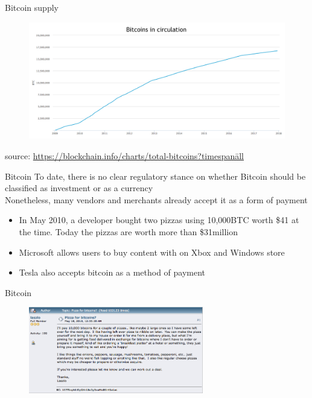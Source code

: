 \documentclass[10pt]{beamer}
\begin{document}

\begin{frame}{Bitcoin supply}
	\begin{figure}[]
		\centering
		\includegraphics  [scale=0.2]{Images/btc-circulation}
	\end{figure}
		\begin{scriptsize}
		source: \href{https://blockchain.info/charts/total-bitcoins?timespan=all}{https://blockchain.info/charts/total-bitcoins?timespan\=all}
	\end{scriptsize}
\end{frame}


\begin{frame}{Bitcoin}
	To date, there is no clear regulatory stance on whether Bitcoin should be classified as investment or as a currency \\ \vspace{3mm}
	Nonetheless, many vendors and merchants already accept it as a form of payment
	\begin{itemize}
		\item In May 2010, a developer bought two pizzas using 10,000BTC worth \$41 at the time. Today the pizzas are worth more than \$31million
		\item Microsoft allows users to buy content with on Xbox and Windows store
		\item Tesla also accepts bitcoin as a method of payment
	\end{itemize}
\end{frame}


\begin{frame}{Bitcoin}
	\begin{figure}[]
		\centering
		\includegraphics  [width=3in]{Images/pizza1}
	\end{figure}
\end{frame}
\end{document}
